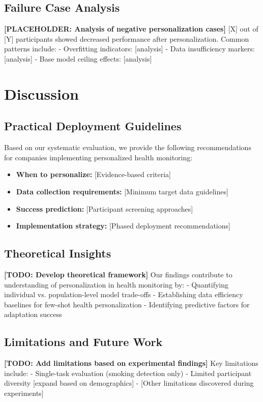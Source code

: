\documentclass[twocolumn]{article}
\begin{document}
\subsection{Failure Case Analysis}
\textbf{[PLACEHOLDER: Analysis of negative personalization cases]}
[X] out of [Y] participants showed decreased performance after personalization. Common patterns include:
- Overfitting indicators: [analysis]
- Data insufficiency markers: [analysis]
- Base model ceiling effects: [analysis]

\section{Discussion}
\label{sec:discussion}


\subsection{Practical Deployment Guidelines}
Based on our systematic evaluation, we provide the following recommendations for companies implementing personalized health monitoring:

\begin{itemize}
    \item \textbf{When to personalize:} [Evidence-based criteria]
    \item \textbf{Data collection requirements:} [Minimum target data guidelines]
    \item \textbf{Success prediction:} [Participant screening approaches]
    \item \textbf{Implementation strategy:} [Phased deployment recommendations]
\end{itemize}

\subsection{Theoretical Insights}
\textbf{[TODO: Develop theoretical framework]}
Our findings contribute to understanding of personalization in health monitoring by:
- Quantifying individual vs. population-level model trade-offs
- Establishing data efficiency baselines for few-shot health personalization
- Identifying predictive factors for adaptation success

\subsection{Limitations and Future Work}
\textbf{[TODO: Add limitations based on experimental findings]}
Key limitations include:
- Single-task evaluation (smoking detection only)
- Limited participant diversity [expand based on demographics]
- [Other limitations discovered during experiments]
\end{document}
